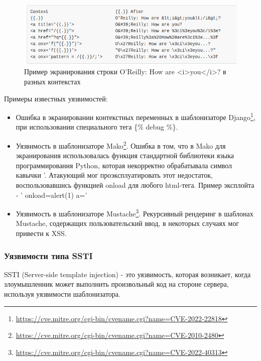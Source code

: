 \documentclass[a4paper]{article}
\begin{document}
\begin{figure}[ht!]
    \includegraphics[width=140mm]{GoEscaping.png}
    \caption{Пример экранирования строки O'Reilly: How are <i>you</i>? в разных контекстах}
    \label{GoEscaping}
    \end{figure}

Примеры известных уязвимостей:

\begin{itemize}
\item Ошибка в экранировании контекстных переменных в шаблонизаторе Django\footnote{\href{https://cve.mitre.org/cgi-bin/cvename.cgi?name=CVE-2022-22818}{https://cve.mitre.org/cgi-bin/cvename.cgi?name=CVE-2022-22818}}, при использовании специального тега \{\% debug \%\}.

\item Уязвимость в шаблонизаторе Mako\footnote{\href{https://cve.mitre.org/cgi-bin/cvename.cgi?name=CVE-2010-2480}{https://cve.mitre.org/cgi-bin/cvename.cgi?name=CVE-2010-2480}}. Ошибка в том, что в Mako для экранирования использовалась функция стандартной библиотеки языка программирования Python, которая некорректно обрабатывала символ кавычки '.  Атакующий мог проэксплуатировать этот недостаток, воспользовавшись функцией onload для любого html-тега. Пример эксплойта - ' onload=alert(1) a='
\item Уязвимость в шаблонизаторе Mustache\footnote{\href{https://cve.mitre.org/cgi-bin/cvename.cgi?name=CVE-2022-40313}{https://cve.mitre.org/cgi-bin/cvename.cgi?name=CVE-2022-40313}}. Рекурсивный рендеринг в шаблонах Mustache, содержащих пользовательский ввод, в некоторых случаях мог привести к XSS.
\end{itemize}

\subsubsection{Уязвимости типа SSTI}

SSTI (Server-side template injection) - это уязвимость, которая возникает, когда злоумышленник может выполнить произвольный код на стороне сервера, используя уязвимости шаблонизатора.
\end{document}
